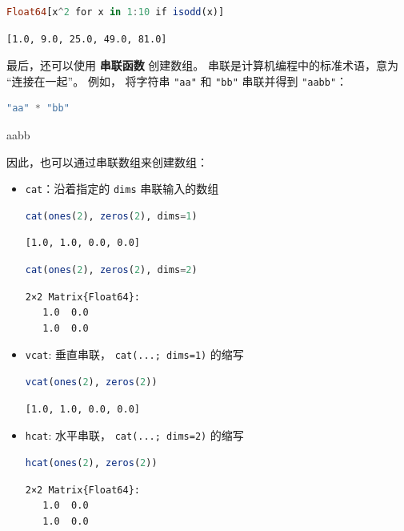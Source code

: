 \documentclass[
  notoc %
]{tufte-book}
\newcommand{\passthrough}[1]{#1}
\begin{document}
\begin{lstlisting}[language=Julia]
Float64[x^2 for x in 1:10 if isodd(x)]
\end{lstlisting}

\begin{lstlisting}[language=Output]
[1.0, 9.0, 25.0, 49.0, 81.0]
\end{lstlisting}

最后，还可以使用 \textbf{串联函数} 创建数组。
串联是计算机编程中的标准术语，意为 ``连接在一起''。 例如， 将字符串
\passthrough{\lstinline!"aa"!} 和 \passthrough{\lstinline!"bb"!}
串联并得到 \passthrough{\lstinline!"aabb"!}：

\begin{lstlisting}[language=Julia]
"aa" * "bb"
\end{lstlisting}

aabb

因此，也可以通过串联数组来创建数组：

\begin{itemize}
\item
  \passthrough{\lstinline!cat!}：沿着指定的
  \passthrough{\lstinline!dims!} 串联输入的数组

  \begin{lstlisting}[language=Julia]
  cat(ones(2), zeros(2), dims=1)
  \end{lstlisting}

  \begin{lstlisting}[language=Output]
  [1.0, 1.0, 0.0, 0.0]
  \end{lstlisting}

  \begin{lstlisting}[language=Julia]
  cat(ones(2), zeros(2), dims=2)
  \end{lstlisting}

  \begin{lstlisting}[language=Output]
  2×2 Matrix{Float64}:
   1.0  0.0
   1.0  0.0
  \end{lstlisting}
\item
  \passthrough{\lstinline!vcat!}: 垂直串联，
  \passthrough{\lstinline!cat(...; dims=1)!} 的缩写

  \begin{lstlisting}[language=Julia]
  vcat(ones(2), zeros(2))
  \end{lstlisting}

  \begin{lstlisting}[language=Output]
  [1.0, 1.0, 0.0, 0.0]
  \end{lstlisting}
\item
  \passthrough{\lstinline!hcat!}: 水平串联，
  \passthrough{\lstinline!cat(...; dims=2)!} 的缩写

  \begin{lstlisting}[language=Julia]
  hcat(ones(2), zeros(2))
  \end{lstlisting}

  \begin{lstlisting}[language=Output]
  2×2 Matrix{Float64}:
   1.0  0.0
   1.0  0.0
  \end{lstlisting}
\end{itemize}
\end{document}
